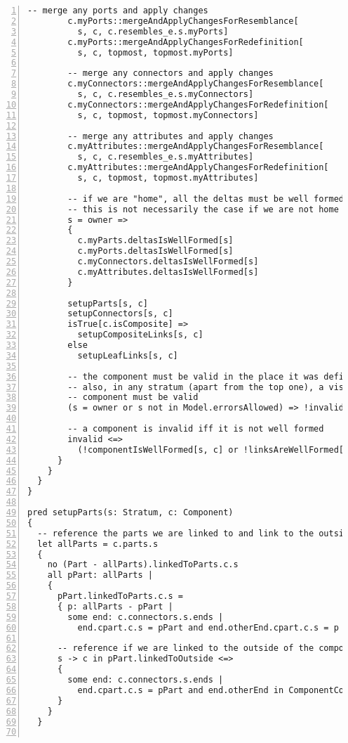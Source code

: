 \begin{lstlisting}[caption={facts.als}, numbers=left]
        -- merge any ports and apply changes
        c.myPorts::mergeAndApplyChangesForResemblance[
          s, c, c.resembles_e.s.myPorts]
        c.myPorts::mergeAndApplyChangesForRedefinition[
          s, c, topmost, topmost.myPorts]
          
        -- merge any connectors and apply changes
        c.myConnectors::mergeAndApplyChangesForResemblance[
          s, c, c.resembles_e.s.myConnectors]
        c.myConnectors::mergeAndApplyChangesForRedefinition[
          s, c, topmost, topmost.myConnectors]
          
        -- merge any attributes and apply changes
        c.myAttributes::mergeAndApplyChangesForResemblance[
          s, c, c.resembles_e.s.myAttributes]
        c.myAttributes::mergeAndApplyChangesForRedefinition[
          s, c, topmost, topmost.myAttributes]
          
        -- if we are "home", all the deltas must be well formed...
        -- this is not necessarily the case if we are not home
        s = owner =>
        {
          c.myParts.deltasIsWellFormed[s]
          c.myPorts.deltasIsWellFormed[s]
          c.myConnectors.deltasIsWellFormed[s]
          c.myAttributes.deltasIsWellFormed[s]
        }
        
        setupParts[s, c]
        setupConnectors[s, c]
        isTrue[c.isComposite] =>
          setupCompositeLinks[s, c]
        else
          setupLeafLinks[s, c]
        
        -- the component must be valid in the place it was defined
        -- also, in any stratum (apart from the top one), a visible
        -- component must be valid
        (s = owner or s not in Model.errorsAllowed) => !invalid
        
        -- a component is invalid iff it is not well formed
        invalid <=>
          (!componentIsWellFormed[s, c] or !linksAreWellFormed[s, c])
      }
    }
  }
}

pred setupParts(s: Stratum, c: Component)
{
  -- reference the parts we are linked to and link to the outside if true
  let allParts = c.parts.s
  {
    no (Part - allParts).linkedToParts.c.s
    all pPart: allParts |
    {
      pPart.linkedToParts.c.s =
      { p: allParts - pPart |
        some end: c.connectors.s.ends |
          end.cpart.c.s = pPart and end.otherEnd.cpart.c.s = p }
        
      -- reference if we are linked to the outside of the component
      s -> c in pPart.linkedToOutside <=>
      {
        some end: c.connectors.s.ends |
          end.cpart.c.s = pPart and end.otherEnd in ComponentConnectorEnd
      }
    }
  }


\end{lstlisting}
